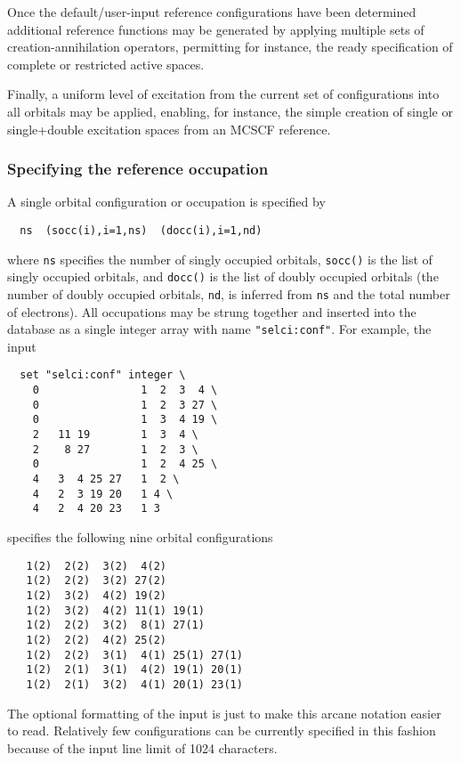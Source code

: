 Once the default/user-input reference configurations have been
determined additional reference functions may be generated by applying
multiple sets of creation-annihilation operators, permitting for
instance, the ready specification of complete or restricted active
spaces.

Finally, a uniform level of excitation from the current set of
configurations into all orbitals may be applied, enabling, for
instance, the simple creation of single or single+double excitation 
spaces from an MCSCF reference.

\subsubsection{Specifying the reference occupation}

A single orbital configuration or occupation is specified by
\begin{verbatim}
  ns  (socc(i),i=1,ns)  (docc(i),i=1,nd)
\end{verbatim}
where \verb+ns+ specifies the number of singly occupied orbitals,
\verb+socc()+ is the list of singly occupied orbitals, and
\verb+docc()+ is the list of doubly occupied orbitals (the
number of doubly occupied orbitals, \verb+nd+, is inferred from
\verb+ns+ and the total number of electrons).  All occupations may be
strung together and inserted into the database as a single integer
array with name \verb+"selci:conf"+.  For example, the input
\begin{verbatim}
  set "selci:conf" integer \
    0                1  2  3  4 \
    0                1  2  3 27 \
    0                1  3  4 19 \
    2   11 19        1  3  4 \
    2    8 27        1  2  3 \
    0                1  2  4 25 \
    4   3  4 25 27   1  2 \
    4   2  3 19 20   1 4 \
    4   2  4 20 23   1 3  
\end{verbatim}
specifies the following nine orbital configurations
\begin{verbatim}
   1(2)  2(2)  3(2)  4(2)
   1(2)  2(2)  3(2) 27(2)
   1(2)  3(2)  4(2) 19(2)
   1(2)  3(2)  4(2) 11(1) 19(1)
   1(2)  2(2)  3(2)  8(1) 27(1)
   1(2)  2(2)  4(2) 25(2)
   1(2)  2(2)  3(1)  4(1) 25(1) 27(1)
   1(2)  2(1)  3(1)  4(2) 19(1) 20(1)
   1(2)  2(1)  3(2)  4(1) 20(1) 23(1)
\end{verbatim}
The optional formatting of the input is just to make this arcane
notation easier to read.  Relatively few configurations can be
currently specified in this fashion because of the input line limit of
1024 characters.

